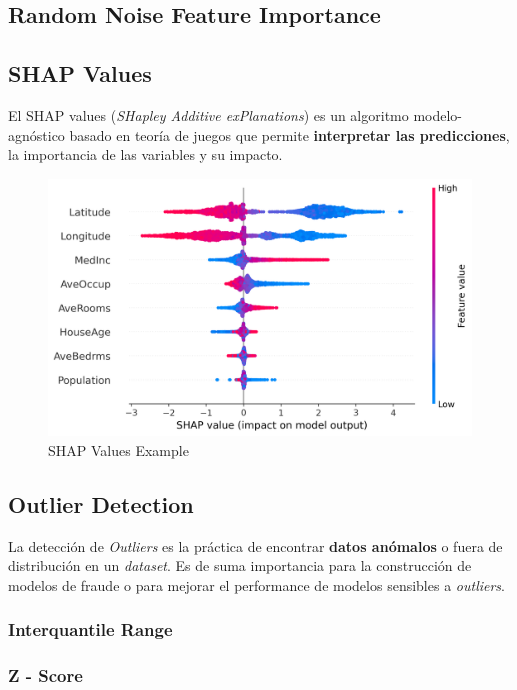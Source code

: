 \subsection{Random Noise Feature Importance}

\subsection{SHAP Values}
\label{subsec:shap_values}

El SHAP values (\textit{SHapley Additive exPlanations}) es un algoritmo modelo-agnóstico basado en teoría de juegos que permite \textbf{interpretar las predicciones}, la importancia de las variables y su impacto.

\begin{figure}[H]
    \center
    \includegraphics[scale=0.55]{notebooks/Others/img/shap_values_example.png}
    \caption{SHAP Values Example}
\end{figure}

\subsection{Outlier Detection}

La detección de \textit{Outliers} es la práctica de encontrar \textbf{datos anómalos} o fuera de distribución en un \textit{dataset}. Es de suma importancia para la construcción de modelos de fraude o para mejorar el performance de modelos sensibles a \textit{outliers}.

\subsubsection{Interquantile Range}

\subsubsection{Z - Score}


